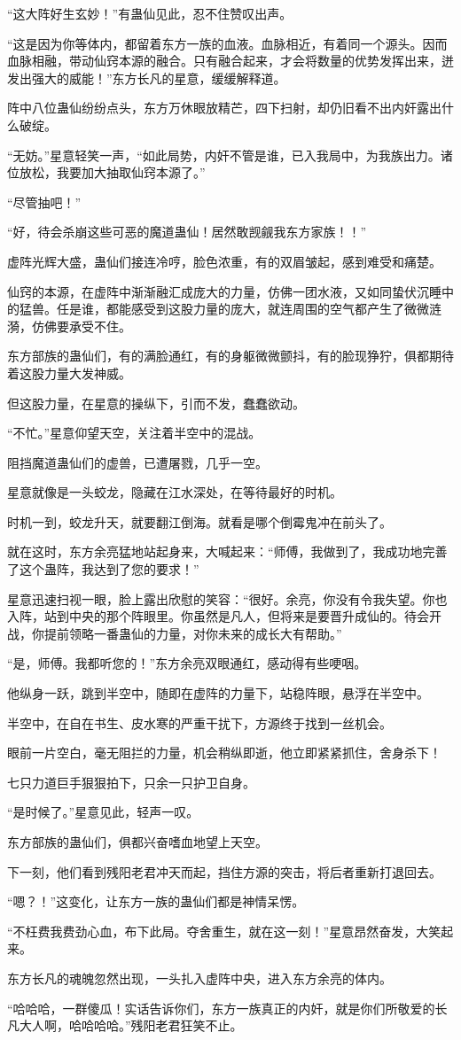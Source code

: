 \begin{this_body}
“这大阵好生玄妙！”有蛊仙见此，忍不住赞叹出声。

“这是因为你等体内，都留着东方一族的血液。血脉相近，有着同一个源头。因而血脉相融，带动仙窍本源的融合。只有融合起来，才会将数量的优势发挥出来，迸发出强大的威能！”东方长凡的星意，缓缓解释道。

阵中八位蛊仙纷纷点头，东方万休眼放精芒，四下扫射，却仍旧看不出内奸露出什么破绽。

“无妨。”星意轻笑一声，“如此局势，内奸不管是谁，已入我局中，为我族出力。诸位放松，我要加大抽取仙窍本源了。”

“尽管抽吧！”

“好，待会杀崩这些可恶的魔道蛊仙！居然敢觊觎我东方家族！！”

虚阵光辉大盛，蛊仙们接连冷哼，脸色浓重，有的双眉皱起，感到难受和痛楚。

仙窍的本源，在虚阵中渐渐融汇成庞大的力量，仿佛一团水液，又如同蛰伏沉睡中的猛兽。任是谁，都能感受到这股力量的庞大，就连周围的空气都产生了微微涟漪，仿佛要承受不住。

东方部族的蛊仙们，有的满脸通红，有的身躯微微颤抖，有的脸现狰狞，俱都期待着这股力量大发神威。

但这股力量，在星意的操纵下，引而不发，蠢蠢欲动。

“不忙。”星意仰望天空，关注着半空中的混战。

阻挡魔道蛊仙们的虚兽，已遭屠戮，几乎一空。

星意就像是一头蛟龙，隐藏在江水深处，在等待最好的时机。

时机一到，蛟龙升天，就要翻江倒海。就看是哪个倒霉鬼冲在前头了。

就在这时，东方余亮猛地站起身来，大喊起来：“师傅，我做到了，我成功地完善了这个蛊阵，我达到了您的要求！”

星意迅速扫视一眼，脸上露出欣慰的笑容：“很好。余亮，你没有令我失望。你也入阵，站到中央的那个阵眼里。你虽然是凡人，但将来是要晋升成仙的。待会开战，你提前领略一番蛊仙的力量，对你未来的成长大有帮助。”

“是，师傅。我都听您的！”东方余亮双眼通红，感动得有些哽咽。

他纵身一跃，跳到半空中，随即在虚阵的力量下，站稳阵眼，悬浮在半空中。

半空中，在自在书生、皮水寒的严重干扰下，方源终于找到一丝机会。

眼前一片空白，毫无阻拦的力量，机会稍纵即逝，他立即紧紧抓住，舍身杀下！

七只力道巨手狠狠拍下，只余一只护卫自身。

“是时候了。”星意见此，轻声一叹。

东方部族的蛊仙们，俱都兴奋嗜血地望上天空。

下一刻，他们看到残阳老君冲天而起，挡住方源的突击，将后者重新打退回去。

“嗯？！”这变化，让东方一族的蛊仙们都是神情呆愣。

“不枉费我费劲心血，布下此局。夺舍重生，就在这一刻！”星意昂然奋发，大笑起来。

东方长凡的魂魄忽然出现，一头扎入虚阵中央，进入东方余亮的体内。

“哈哈哈，一群傻瓜！实话告诉你们，东方一族真正的内奸，就是你们所敬爱的长凡大人啊，哈哈哈哈。”残阳老君狂笑不止。

\end{this_body}

